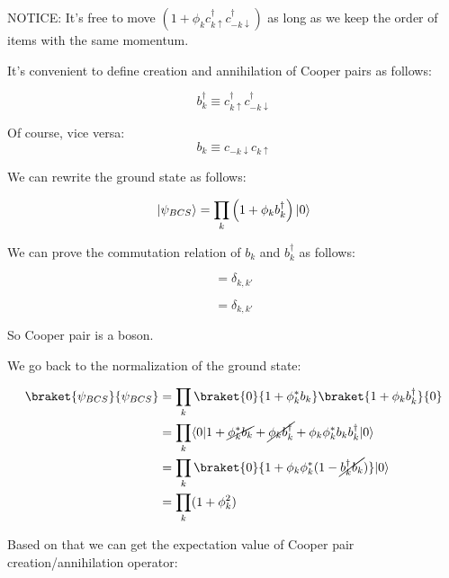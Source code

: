 \documentclass[14pt, a4paper]{extarticle}
\DeclarePairedDelimiter\bra{\langle}{\rvert}
\DeclarePairedDelimiter\ket{\lvert}{\rangle}
\begin{document}
NOTICE: It's free to move $(1 + \phi_{k} c_{k\uparrow}^\dagger c_{-k\downarrow}^\dagger)$ as long as we keep the order of items with the same momentum.

It's convenient to define creation and annihilation of Cooper pairs as follows:

\begin{equation}
    b_{k}^\dagger \equiv c_{k\uparrow}^\dagger c_{-k\downarrow}^\dagger
\end{equation}

Of course, vice versa:
\begin{equation}
    b_{k} \equiv c_{-k\downarrow} c_{k\uparrow}
\end{equation}

We can rewrite the ground state as follows:

\begin{equation}
    \ket{\psi_{BCS}} = \prod_{k} \left(1 + \phi_{k} b_{k}^\dagger\right) \ket{0}
\end{equation}

We can prove the commutation relation of $b_{k}$ and $b_{k}^\dagger$ as follows:

\begin{equation}
    [b_{k}, b_{k'}^\dagger] = \delta_{k, k'}
\end{equation}

\begin{equation}
    [(1-b_{k}), (1-b_{k'}^\dagger)] = \delta_{k, k'}
\end{equation}

So Cooper pair is a boson.

We go back to the normalization of the ground state:

\begin{align}
    \braket{\psi_{BCS}}{\psi_{BCS}} & = \prod_{k} \braket{0}{1 + \phi^*_{k} b_{k}} \braket{1 + \phi_{k} b_{k}^\dagger}{0} \\
    & = \prod_{k} \bra{0} 1 + \cancel{\phi^*_{k} b_{k}} + \cancel{\phi_{k} b_{k}^\dagger} + \phi_{k} \phi^*_{k} b_{k} b_{k}^\dagger \ket{0} \\
    & = \prod_{k} \braket{0}{1 + \phi_{k} \phi^*_{k} (1 - \cancel{b_{k}^\dagger b_{k}})} \ket{0} \\
    & = \prod_{k} (1 + \phi^2_{k})
\end{align}

Based on that we can get the expectation value of Cooper pair creation/annihilation operator:
\end{document}
